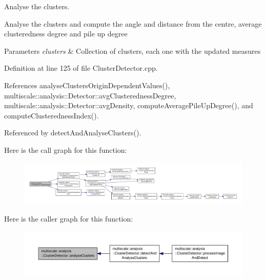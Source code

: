 Analyse the clusters. 

Analyse the clusters and compute the angle and distance from the centre, average clusteredness degree and pile up degree


\begin{DoxyParams}{Parameters}
{\em clusters} & Collection of clusters, each one with the updated measures \\
\hline
\end{DoxyParams}


Definition at line 125 of file Cluster\-Detector.\-cpp.



References analyse\-Clusters\-Origin\-Dependent\-Values(), multiscale\-::analysis\-::\-Detector\-::avg\-Clusteredness\-Degree, multiscale\-::analysis\-::\-Detector\-::avg\-Density, compute\-Average\-Pile\-Up\-Degree(), and compute\-Clusteredness\-Index().



Referenced by detect\-And\-Analyse\-Clusters().



Here is the call graph for this function\-:
\nopagebreak
\begin{figure}[H]
\begin{center}
\leavevmode
\includegraphics[width=350pt]{classmultiscale_1_1analysis_1_1ClusterDetector_af994e960ba3cd76cc67e714ea276264a_cgraph}
\end{center}
\end{figure}




Here is the caller graph for this function\-:
\nopagebreak
\begin{figure}[H]
\begin{center}
\leavevmode
\includegraphics[width=350pt]{classmultiscale_1_1analysis_1_1ClusterDetector_af994e960ba3cd76cc67e714ea276264a_icgraph}
\end{center}
\end{figure}



